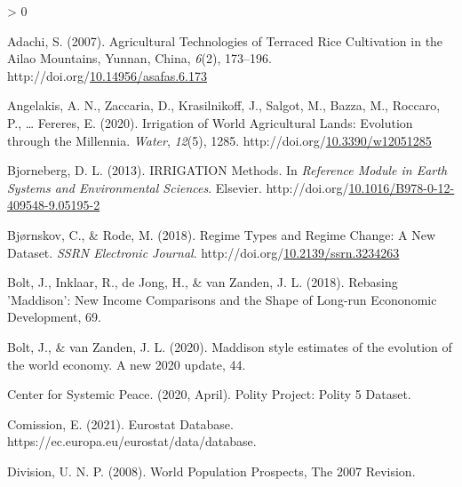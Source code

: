 \documentclass[12pt,twoside]{reedthesis}
\newlength{\cslhangindent}
\newenvironment{CSLReferences}[2] %
 {%
  \setlength{\parindent}{0pt}
  \ifodd #1 \everypar{\setlength{\hangindent}{\cslhangindent}}\ignorespaces\fi
  \ifnum #2 > 0
  \setlength{\parskip}{#2\baselineskip}
  \fi
 }%
 {}
\begin{document}
\hypertarget{refs}{}
\begin{CSLReferences}{1}{0}
\leavevmode\hypertarget{ref-adachiAgriculturalTechnologiesTerraced2007}{}%
Adachi, S. (2007). Agricultural {Technologies} of {Terraced Rice Cultivation} in the {Ailao Mountains}, {Yunnan}, {China}, \emph{6}(2), 173--196. http://doi.org/\href{https://doi.org/10.14956/asafas.6.173}{10.14956/asafas.6.173}

\leavevmode\hypertarget{ref-angelakisIrrigationWorldAgricultural2020}{}%
Angelakis, A. N., Zaccaria, D., Krasilnikoff, J., Salgot, M., Bazza, M., Roccaro, P., \ldots{} Fereres, E. (2020). Irrigation of {World Agricultural Lands}: Evolution through the {Millennia}. \emph{Water}, \emph{12}(5), 1285. http://doi.org/\href{https://doi.org/10.3390/w12051285}{10.3390/w12051285}

\leavevmode\hypertarget{ref-bjornebergIRRIGATIONMethods2013}{}%
Bjorneberg, D. L. (2013). {IRRIGATION} \textbar{} {Methods}. In \emph{Reference {Module} in {Earth Systems} and {Environmental Sciences}}. {Elsevier}. http://doi.org/\href{https://doi.org/10.1016/B978-0-12-409548-9.05195-2}{10.1016/B978-0-12-409548-9.05195-2}

\leavevmode\hypertarget{ref-bjornskovRegimeTypesRegime2018}{}%
Bjørnskov, C., \& Rode, M. (2018). Regime {Types} and {Regime Change}: A {New Dataset}. \emph{SSRN Electronic Journal}. http://doi.org/\href{https://doi.org/10.2139/ssrn.3234263}{10.2139/ssrn.3234263}

\leavevmode\hypertarget{ref-boltRebasingMaddisonNew2018}{}%
Bolt, J., Inklaar, R., de Jong, H., \& van Zanden, J. L. (2018). Rebasing '{Maddison}': New {Income Comparisons} and the {Shape} of {Long}-run {Econonomic Development}, 69.

\leavevmode\hypertarget{ref-boltMaddisonStyleEstimates2020}{}%
Bolt, J., \& van Zanden, J. L. (2020). Maddison style estimates of the evolution of the world economy. {A} new 2020 update, 44.

\leavevmode\hypertarget{ref-centerforsystemicpeacePolityProjectPolity2020}{}%
Center for Systemic Peace. (2020, April). Polity {Project}: Polity 5 {Dataset}.

\leavevmode\hypertarget{ref-europeancomissionEurostatDatabase2021}{}%
Comission, E. (2021). Eurostat {Database}. https://ec.europa.eu/eurostat/data/database.

\leavevmode\hypertarget{ref-unitednationspopulationdivisionWorldPopulationProspects2008}{}%
Division, U. N. P. (2008). World {Population Prospects}, {The} 2007 {Revision}.


\end{CSLReferences}
\end{document}
